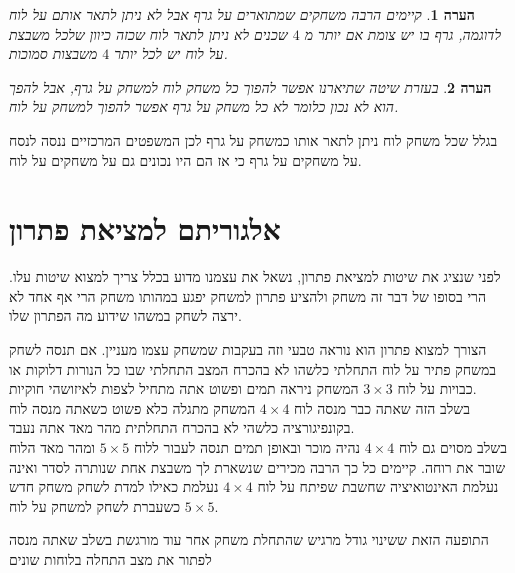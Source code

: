 \documentclass[12pt,twoside]{article}
\newtheorem{comm}{הערה}[section]
\begin{document}
\begin{comm}
    קיימים הרבה משחקים שמתוארים על גרף אבל לא ניתן לתאר אותם על לוח
    לדוגמה,
    גרף בו יש צומת אם יותר מ
    $4$
    שכנים לא ניתן לתאר לוח שכזה כיוון שלכל משבצת על לוח
    יש לכל יותר 
    $4$
    משבצות סמוכות.
\end{comm}

\begin{comm}
    בעזרת שיטה שתיארנו אפשר להפוך כל משחק לוח למשחק על גרף, אבל להפך הוא לא נכון 
    כלומר לא כל משחק על גרף אפשר להפוך למשחק על לוח.
\end{comm}

בגלל שכל משחק לוח ניתן לתאר אותו כמשחק על גרף לכן המשפטים המרכזיים ננסה לנסח על משחקים על גרף כי אז הם היו נכונים
גם על משחקים על לוח.


\newpage

\section{ אלגוריתם למציאת פתרון}
לפני שנציג את שיטות למציאת פתרון, נשאל את עצמנו מדוע בכלל צריך למצוא שיטות עלו.
הרי בסופו של דבר זה משחק ולהציע פתרון למשחק יפגע במהותו משחק הרי אף אחד לא ירצה
לשחק במשהו שידוע מה הפתרון שלו.

הצורך למצוא פתרון הוא נוראה טבעי וזה בעקבות שמשחק עצמו מעניין.
אם תנסה לשחק במשחק פתיר על לוח התחלתי כלשהו לא בהכרח המצב התחלתי שבו כל הנורות דלוקות או כבויות
על לוח 
$3 \times 3$
המשחק ניראה תמים ופשוט אתה מתחיל לצפות לאיזושהי חוקיות.
\\
בשלב הזה שאתה כבר מנסה לוח 
$4 \times 4$
המשחק מתגלה כלא פשוט כשאתה מנסה לוח בקונפיגורציה כלשהי לא בהכרח התחלתית
מהר מאד אתה נעבד.
\\
בשלב מסוים גם לוח 
$4 \times 4$
נהיה מוכר ובאופן תמים תנסה לעבור ללוח
$5 \times 5$
ומהר מאד הלוח שובר את רוחה.
קיימים כל כך הרבה מכירים שנשארת לך משבצת אחת שנותרה לסדר ואינה נעלמת
האינטואיציה שחשבת שפיתח על לוח 
$4 \times 4$
נעלמת כאילו למדת לשחק משחק חדש 
כשעברת לשחק למשחק
על לוח
$5 \times 5$.

התופעה הזאת ששינוי גודל מרגיש שהתחלת משחק אחר עוד
מורגשת בשלב שאתה מנסה לפתור את מצב התחלה בלוחות שונים
\end{document}
